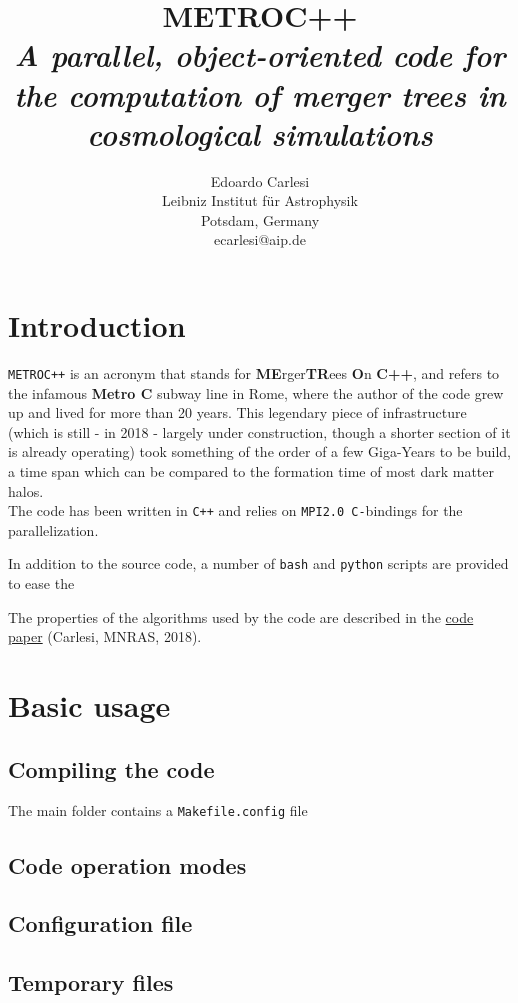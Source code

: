 \documentclass{article}
\title{\textbf{METROC++} \\
\emph{A parallel, object-oriented code for the computation of merger trees in 
cosmological simulations}}
\author{Edoardo Carlesi\\ Leibniz Institut f\"ur Astrophysik\\ Potsdam, Germany\\ ecarlesi@aip.de}
\begin{document}
\maketitle
\tableofcontents
\newpage

\section{Introduction}
\texttt{METROC++} is an acronym that stands for \textbf{ME}rger\textbf{TR}ees \textbf{O}n \textbf{C++}, and refers to the 
infamous \textbf{Metro C} subway line in Rome, where the author of the code grew up and lived for more than 20 years.
This legendary piece of infrastructure (which is still - in 2018 - largely under construction, though a shorter section of 
it is already operating) took something of the order of a few Giga-Years to be build, a time span which can be compared to the
formation time of most dark matter halos.\\

The code has been written in \texttt{C++} and relies on \texttt{MPI2.0 C-}bindings for the parallelization.

In addition to the source code, a number of \texttt{bash} and \texttt{python} scripts are provided to ease the 

The properties of the algorithms used by the code are described in the \href{https://arxiv.org/abs/1612.07053}{code paper} (Carlesi, MNRAS, 2018).



\section{Basic usage}
\subsection{Compiling the code}

The main folder contains a \texttt{Makefile.config} file 

\subsection{Code operation modes}
\subsection{Configuration file}
\subsection{Temporary files}
\end{document}
